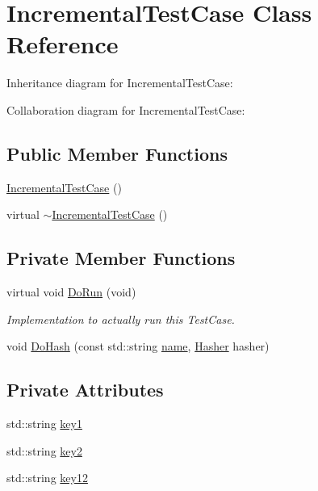 \hypertarget{classIncrementalTestCase}{}\section{Incremental\+Test\+Case Class Reference}
\label{classIncrementalTestCase}


Inheritance diagram for Incremental\+Test\+Case\+:


Collaboration diagram for Incremental\+Test\+Case\+:
\subsection*{Public Member Functions}
\begin{DoxyCompactItemize}
\item 
\hyperlink{classIncrementalTestCase_acf26cc769ec7aa332c74cd8ac4e46959}{Incremental\+Test\+Case} ()
\item 
virtual \hyperlink{classIncrementalTestCase_ac162c50d411c61c85d98fb621739c7a0}{$\sim$\+Incremental\+Test\+Case} ()
\end{DoxyCompactItemize}
\subsection*{Private Member Functions}
\begin{DoxyCompactItemize}
\item 
virtual void \hyperlink{classIncrementalTestCase_a8ac4a672673048795b6bd15a6b82eb69}{Do\+Run} (void)
\begin{DoxyCompactList}\small\item\em Implementation to actually run this Test\+Case. \end{DoxyCompactList}\item 
void \hyperlink{classIncrementalTestCase_aaf68c1b2c7547e01d4e8f3aaac196947}{Do\+Hash} (const std\+::string \hyperlink{generate__test__data__lte__spectrum__model_8m_ab74e6bf80237ddc4109968cedc58c151}{name}, \hyperlink{classns3_1_1Hasher}{Hasher} hasher)
\end{DoxyCompactItemize}
\subsection*{Private Attributes}
\begin{DoxyCompactItemize}
\item 
std\+::string \hyperlink{classIncrementalTestCase_a1bb155138fa8d3fe7c2f86702623d9a6}{key1}
\item 
std\+::string \hyperlink{classIncrementalTestCase_a0703825a7eb63a4b697ddc3d6841dc53}{key2}
\item 
std\+::string \hyperlink{classIncrementalTestCase_afba5b3d91ad2937346bcb4279fb48e69}{key12}
\end{DoxyCompactItemize}
